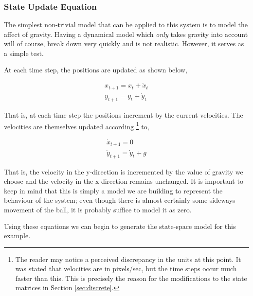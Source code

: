 \subsubsection{State Update Equation}
The simplest non-trivial model that can be applied to this system is to model
the affect of gravity. Having a dynamical model which \emph{only} takes gravity
into account will of course, break down very quickly and is not realistic. However,
it serves as a simple test.

At each time step, the positions are updated as shown below,

\begin{align}
x_{t+1} = x_{t} + \dot{x}_{t} \\
y_{t+1} = y_{t} + \dot{y}_{t}
\end{align}

That is, at each time step the positions increment by the current velocities.
The velocities are themselves updated according
\footnote{The reader may notice a
perceived discrepancy in the units
at this point. It was stated that velocities are in pixels/sec, but the time
steps occur much faster than this. This is precisely the reason for the
modifications to the state matrices in Section \ref{sec:discrete}.
}
to,

\begin{align}
\dot{x}_{t+1} = 0 \\
\dot{y}_{t+1} = \dot{y}_{t} + g
\end{align}

That is, the velocity in the y-direction is incremented by the value of gravity
we choose and the velocity in the x direction remains unchanged.
It is important to keep in mind that this is simply a model we are building to
represent the behaviour of the
system; even though there is almost certainly some sideways movement of the ball,
it is probably suffice to model it as zero.

Using these equations we can begin to generate the state-space model for this
example.


